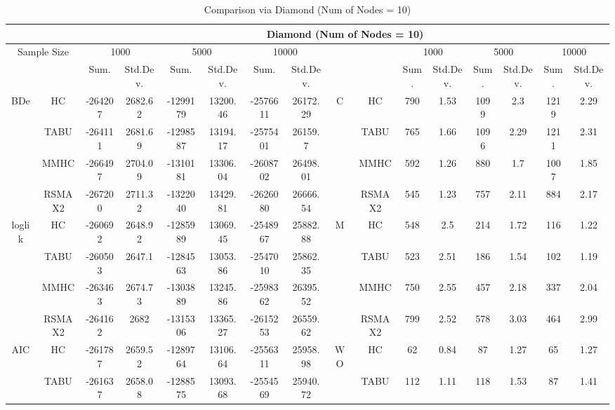 \begin{table}[t]																										
\centering	\caption{Comparison via Diamond (Num of Nodes = 10)}	\tiny																						
{\tabcolsep=0.01in																										
\begin{tabular}{cc||cc|cc|cc||cc|cc|cc|cc}																										
\hline																										
&	&	\multicolumn{14}{c}{Diamond	(Num	of	Nodes	=	10)}\tabularnewline																			
\hline																										
\multicolumn{2}{c||}{Sample	Size}	&	\multicolumn{2}{c|}{1000}	&	\multicolumn{2}{c|}{5000}	&	\multicolumn{2}{c||}{10000}	&	&	&	\multicolumn{2}{c|}{1000}	&	\multicolumn{2}{c|}{5000}	&	\multicolumn{2}{c}{10000}\tabularnewline											
\hline																										
&	&	Sum.	&	Std.Dev.	&	Sum.	&	Std.Dev.	&	Sum.	&	Std.Dev.	&	&	&	Sum.	&	Std.Dev.	&	Sum.	&	Std.Dev.	&	Sum.	&	Std.Dev.\tabularnewline
\hline																										
\hline																										
\multirow{4}{*}{BDe} & HC &	-264207 & 	2682.62 & 	-1299179 & 	13200.46 & 	-2576611 & 	26172.29 & 	\multirow{4}{*}{C} & HC &	790 & 	1.53 & 	1099 & 	2.3 & 	1219 & 	2.29\tabularnewline													
& TABU &	-264111 & 	2681.69 & 	-1298587 & 	13194.17 & 	-2575401 & 	26159.7 & 	& TABU &	765 & 	1.66 & 	1096 & 	2.29 & 	1211 & 	2.31\tabularnewline													
& MMHC &	-266497 & 	2704.09 & 	-1310181 & 	13306.04 & 	-2608702 & 	26498.01 & 	& MMHC &	592 & 	1.26 & 	880 & 	1.7 & 	1007 & 	1.85\tabularnewline													
& RSMAX2 &	-267200 & 	2711.32 & 	-1322040 & 	13429.81 & 	-2626080 & 	26666.54 & 	& RSMAX2 &	545 & 	1.23 & 	757 & 	2.11 & 	884 & 	2.17\tabularnewline													
\hline																										
\multirow{4}{*}{loglik} & HC &	-260692 & 	2648.92 & 	-1285989 & 	13069.45 & 	-2548967 & 	25882.88 & 	\multirow{4}{*}{M} & HC &	548 & 	2.5 & 	214 & 	1.72 & 	116 & 	1.22\tabularnewline													
& TABU &	-260503 & 	2647.1 & 	-1284563 & 	13053.86 & 	-2547010 & 	25862.35 & 	& TABU &	523 & 	2.51 & 	186 & 	1.54 & 	102 & 	1.19\tabularnewline													
& MMHC &	-263463 & 	2674.73 & 	-1303889 & 	13245.86 & 	-2598362 & 	26395.52 & 	& MMHC &	750 & 	2.55 & 	457 & 	2.18 & 	337 & 	2.04\tabularnewline													
& RSMAX2 &	-264162 & 	2682 & 	-1315306 & 	13365.27 & 	-2615253 & 	26559.62 & 	& RSMAX2 &	799 & 	2.52 & 	578 & 	3.03 & 	464 & 	2.99\tabularnewline													
\hline																										
\multirow{4}{*}{AIC} & HC &	-261787 & 	2659.52 & 	-1289764 & 	13106.64 & 	-2556311 & 	25958.98 & 	\multirow{4}{*}{WO} & HC &	62 & 	0.84 & 	87 & 	1.27 & 	65 & 	1.27\tabularnewline													
& TABU &	-261637 & 	2658.08 & 	-1288575 & 	13093.68 & 	-2554569 & 	25940.72 & 	& TABU &	112 & 	1.11 & 	118 & 	1.53 & 	87 & 	1.41\tabularnewline													

\end{tabular}}
\end{table}
